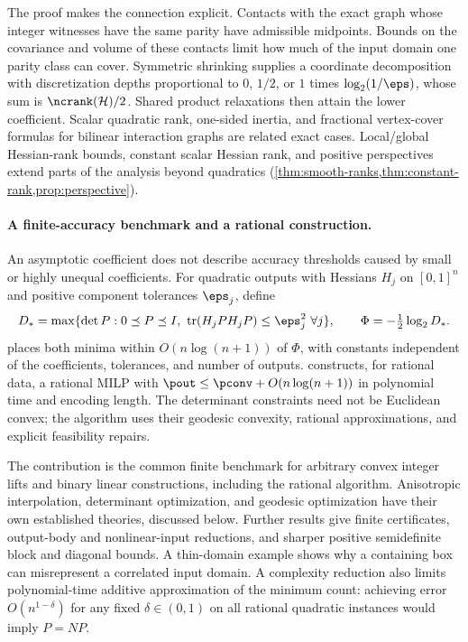 The proof makes the connection explicit. Contacts with the exact graph
whose integer witnesses have the same parity have admissible midpoints.
Bounds on the covariance and volume of these contacts limit how much of
the input domain one parity class can cover. Symmetric shrinking supplies
a coordinate decomposition with discretization depths proportional to
$0$, $1/2$, or $1$ times $\log_2(1/\eps)$, whose sum is
$\ncrank(\mathcal H)/2$. Shared product relaxations then attain the lower
coefficient. Scalar quadratic rank, one-sided inertia, and fractional
vertex-cover formulas for bilinear interaction graphs are related exact
cases. Local/global Hessian-rank bounds, constant scalar Hessian rank,
and positive perspectives extend parts of the analysis beyond quadratics
(\cref{thm:smooth-ranks,thm:constant-rank,prop:perspective}).

\paragraph{A finite-accuracy benchmark and a rational construction.}
An asymptotic coefficient does not describe accuracy thresholds caused by
small or highly unequal coefficients. For quadratic outputs with Hessians
$H_j$ on $[0,1]^n$ and positive component tolerances $\eps_j$, define
\[
 D_* = \max\{\det P:0\preceq P\preceq I,
       \ \operatorname{tr}(H_jPH_jP)\le\eps_j^2\ \forall j\},
 \qquad \Phi=-\tfrac12\log_2 D_*.
\]
 places both minima within
$O(n\log(n+1))$ of $\Phi$, with constants independent of the coefficients,
tolerances, and number of outputs.  constructs,
for rational data, a rational MILP with
$\pout\le\pconv+O(n\log(n+1))$ in polynomial time and encoding length.
The determinant constraints need not be Euclidean convex; the algorithm
uses their geodesic convexity, rational approximations, and explicit
feasibility repairs.

The contribution is the common finite benchmark for arbitrary convex
integer lifts and binary linear constructions, including the rational
algorithm. Anisotropic interpolation, determinant optimization, and
geodesic optimization have their own established theories, discussed
below. Further results give finite certificates, output-body and
nonlinear-input reductions, and sharper positive semidefinite block and
diagonal bounds. A thin-domain example shows why a containing box can
misrepresent a correlated input domain. A complexity reduction also limits
polynomial-time additive approximation of the minimum count: achieving
error $O(n^{1-\delta})$ for any fixed $\delta\in(0,1)$ on all rational
quadratic instances would imply $P=NP$.

